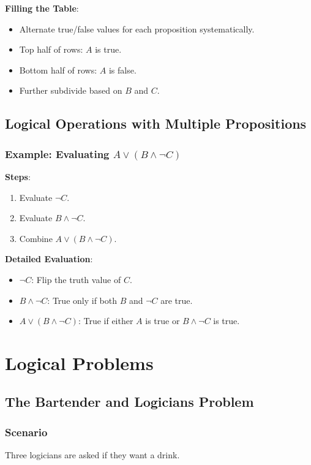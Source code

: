 \documentclass{article}
\begin{document}
\textbf{Filling the Table}:
\begin{itemize}
    \item Alternate true/false values for each proposition systematically.
    \item Top half of rows: $A$ is true.
    \item Bottom half of rows: $A$ is false.
    \item Further subdivide based on $B$ and $C$.
\end{itemize}

\subsection{Logical Operations with Multiple Propositions}

\subsubsection{Example: Evaluating $A \lor (B \land \neg C)$}

\textbf{Steps}:
\begin{enumerate}
    \item Evaluate $\neg C$.
    \item Evaluate $B \land \neg C$.
    \item Combine $A \lor (B \land \neg C)$.
\end{enumerate}

\textbf{Detailed Evaluation}:
\begin{itemize}
    \item $\neg C$: Flip the truth value of $C$.
    \item $B \land \neg C$: True only if both $B$ and $\neg C$ are true.
    \item $A \lor (B \land \neg C)$: True if either $A$ is true or $B \land \neg C$ is true.
\end{itemize}

\section{Logical Problems}

\subsection{The Bartender and Logicians Problem}

\subsubsection{Scenario}
Three logicians are asked if they want a drink.
\end{document}
